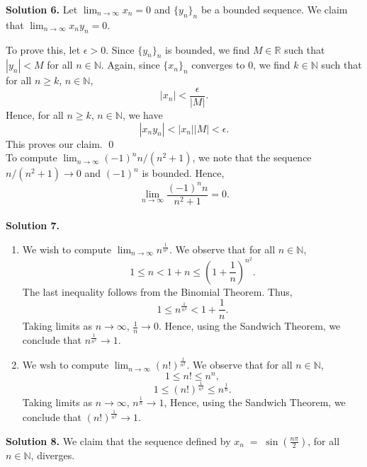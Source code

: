 \documentclass[10pt]{article}
\begin{document}
        \clearpage

        \textbf{Solution 6.}
        Let $\lim_{n\to\infty} x_n = 0$ and $\{y_n\}_n$ be a bounded sequence. We claim that $\lim_{n\to\infty} x_ny_n = 0$.
        
        To prove this, let $\epsilon > 0$.
        Since $\{y_n\}_n$ is bounded, we find $M \in \mathbb{R}$ such that $|y_n| < M$ for all $n \in \mathbb{N}$.
        Again, since $\{x_n\}_n$ converges to $0$, we find $k \in \mathbb{N}$ such that for all $n \ge k$, $n \in \mathbb{N}$,
        \[|x_n| < \frac{\epsilon}{|M|}.\]
        Hence, for all $n \ge k$, $n \in \mathbb{N}$, we have
        \[|x_ny_n| < |x_n| |M| < \epsilon.\]
        This proves our claim. \qed\\

        To compute $\lim_{n\to\infty} (-1)^n n / (n^2 + 1)$, we note that the sequence $n/(n^2 + 1) \to 0$ and $(-1)^n$ is bounded.
        Hence,
        \[\lim_{n\to\infty} \frac{(-1)^n n}{n^2 + 1} = 0.\]\\

        \textbf{Solution 7.}
        \begin{enumerate}
                \item We wish to compute $\lim_{n\to\infty} n^{\frac{1}{n^2}}$.
                We observe that for all $n \in \mathbb{N}$,
                \[1 \le  n < 1 + n \le \left(1 + \frac{1}{n}\right)^{n^2}.\]
                The last inequality follows from the Binomial Theorem. Thus,
                \[1 \le n^{\frac{1}{n^2}} < 1 + \frac{1}{n}.\]
                Taking limits as $n \to \infty$, $\frac{1}{n} \to 0$. Hence, using the Sandwich Theorem, we conclude that 
                $n^{\frac{1}{n^2}} \to 1$. \\

                \item We wsh to compute $\lim_{n\to\infty} (n!)^{\frac{1}{n^2}}$.
                We observe that for all $n \in \mathbb{N}$,
                \[1 \le n! \le n^n,\]
                \[1 \le (n!)^{\frac{1}{n^2}} \le n^{\frac{1}{n}}.\]
                Taking limits as $n \to \infty$, $n^{\frac{1}{n}} \to 1$, Hence, using the Sandwich Theorem, we conclude that
                $(n!)^{\frac{1}{n^2}} \to 1$. \\
        \end{enumerate}

        \textbf{Solution 8.}
        We claim that the sequence defined by $x_n \;=\; \sin(\frac{n\pi}{2})$, for all $n \in \mathbb{N}$, diverges.
\end{document}
